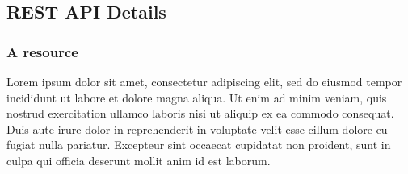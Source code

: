 \subsection{REST API Details}


\subsubsection*{A resource}


Lorem ipsum dolor sit amet, consectetur adipiscing elit, sed do eiusmod tempor incididunt ut labore et dolore magna aliqua. Ut enim ad minim veniam, quis nostrud exercitation ullamco laboris nisi ut aliquip ex ea commodo consequat. Duis aute irure dolor in reprehenderit in voluptate velit esse cillum dolore eu fugiat nulla pariatur. Excepteur sint occaecat cupidatat non proident, sunt in culpa qui officia deserunt mollit anim id est laborum.


